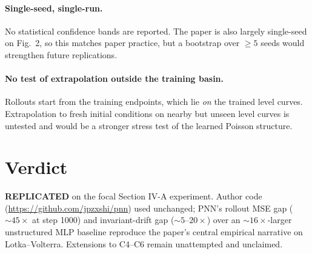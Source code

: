 \documentclass[11pt]{article}
\begin{document}
\paragraph{Single-seed, single-run.} No statistical confidence bands are
reported. The paper is also largely single-seed on Fig.~2, so this matches
paper practice, but a bootstrap over $\ge 5$ seeds would strengthen future
replications.

\paragraph{No test of extrapolation outside the training basin.} Rollouts start
from the training endpoints, which lie \emph{on} the trained level curves.
Extrapolation to fresh initial conditions on nearby but unseen level curves is
untested and would be a stronger stress test of the learned Poisson structure.

\section{Verdict}
\textbf{REPLICATED} on the focal Section IV-A experiment. Author code
(\url{https://github.com/jpzxshi/pnn}) used unchanged; PNN's rollout MSE gap
($\sim 45\times$ at step 1000) and invariant-drift gap ($\sim 5$--$20\times$)
over an $\sim 16\times$-larger unstructured MLP baseline reproduce the paper's
central empirical narrative on Lotka--Volterra. Extensions to
C4--C6 remain unattempted and unclaimed.
\end{document}
